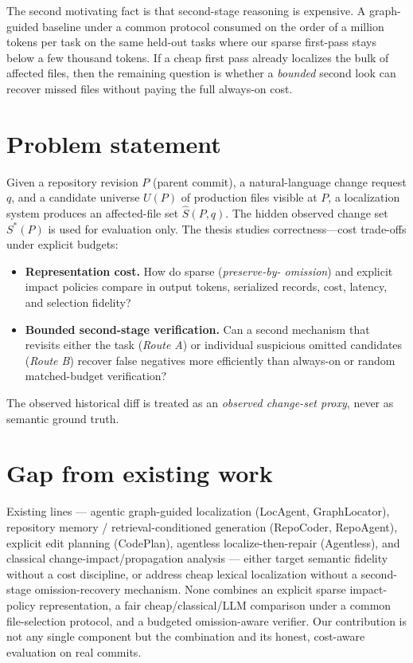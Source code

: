\documentclass[11pt,a4paper]{article}
\begin{document}
The second motivating fact is that second-stage reasoning is expensive.
A graph-guided baseline under a common protocol consumed on the order of a
million tokens per task on the same held-out tasks where our sparse first-pass
stays below a few thousand tokens. If a cheap first pass already localizes the
bulk of affected files, then the remaining question is whether a \emph{bounded}
second look can recover missed files without paying the full always-on cost.

\section{Problem statement}
\label{sec:problem}

Given a repository revision $P$ (parent commit), a natural-language change
request $q$, and a candidate universe $U(P)$ of production files visible at
$P$, a localization system produces an affected-file set $\hat{S}(P,q)$.
The hidden observed change set $S^*(P)$ is used for evaluation only. The thesis
studies correctness---cost trade-offs under explicit budgets:

\begin{itemize}
  \item \textbf{Representation cost.} How do sparse (\emph{preserve-by-
  omission}) and explicit impact policies compare in output tokens, serialized
  records, cost, latency, and selection fidelity?
  \item \textbf{Bounded second-stage verification.} Can a second mechanism that
  revisits either the task (\emph{Route A}) or individual suspicious omitted
  candidates (\emph{Route B}) recover false negatives more efficiently than
  always-on or random matched-budget verification?
\end{itemize}

The observed historical diff is treated as an \emph{observed change-set proxy},
never as semantic ground truth.

\section{Gap from existing work}
\label{sec:gap}

Existing lines --- agentic graph-guided localization (LocAgent,
GraphLocator), repository memory / retrieval-conditioned generation (RepoCoder,
RepoAgent), explicit edit planning (CodePlan), agentless localize-then-repair
(Agentless), and classical change-impact/propagation analysis --- either
target semantic fidelity without a cost discipline, or address cheap lexical
localization without a second-stage omission-recovery mechanism. None combines
an explicit sparse impact-policy representation, a fair cheap/classical/LLM
comparison under a common file-selection protocol, and a budgeted
omission-aware verifier. Our contribution is not any single component but the
combination and its honest, cost-aware evaluation on real commits.
\end{document}
